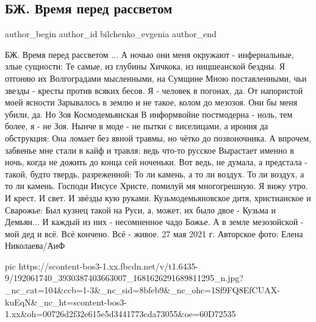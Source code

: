  
 
 
 
 
 
\subsection{БЖ. Время перед рассветом}
\label{sec:27_05_2021.fb.bilchenko_evgenia.1.vremja_pered_rassvetom}
\ifcmt
 author_begin
   author_id bilchenko_evgenia
 author_end
\fi

БЖ. Время перед рассветом
... А ночью они меня окружают - инфернальные, злые сущности:
Те самые, из глубины Хичкока, из ницшеанской бездны.
Я отгоняю их Волгоградами мысленными, на Сумщине
Мною поставленными, чьи звезды - кресты против всяких бесов.
Я - человек в погонах, да. От напористой моей ясности
Зарывалось в землю и не такое, колом до мезозоя.
Они бы меня убили, да. Но Зоя Космодемьянская 
В информвойне постмодерна - ноль, тем более, я - не Зоя.
Нынче в моде - не пытки с виселицами, а ирония да обструкция:
Она ломает без явной травмы, но чётко до позвоночника.
А впрочем, забвенье мне стали в кайф и травля: ведь что-то русское
Вырастает именно в ночь, когда не дожить до конца сей ноченьки.
Вот ведь, не думала, а предстала - такой, будто твердь, разреженной:
То ли камень, а то ли воздух. То ли воздух, а то ли камень.
Господи Иисусе Христе, помилуй мя многогрешную.
Я вижу утро. И крест. И свет. И звёзды кую руками.
Кузьмодемьяновское дитя, христианское и Сварожье:
Был кузнец такой на Руси, а, может, их было двое -
Кузьма и Демьян... И каждый из них - несомненное чадо Божье.
А в земле мезозойской - мой дед и всё. Всё кончено. Всё - живое.
27 мая 2021 г.
Авторское фото: Елена Николаева/АиФ

\ifcmt
  pic https://scontent-bos3-1.xx.fbcdn.net/v/t1.6435-9/192061740_3930387403663007_1681626291689811295_n.jpg?_nc_cat=104&ccb=1-3&_nc_sid=8bfeb9&_nc_ohc=1Sf9FQ8EfCUAX-kuEqN&_nc_ht=scontent-bos3-1.xx&oh=00726d2f32e615e5d3441773cda73055&oe=60D72535
\fi

